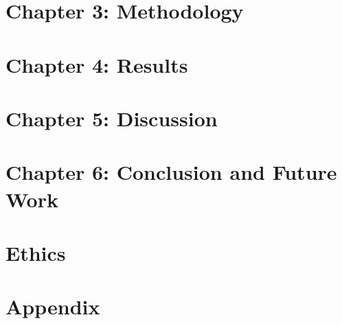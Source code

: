 \documentclass[12pt,oneside,letterpaper,english]{article}
\begin{document}
\section{Chapter 3: Methodology} \label{meth}
 
\newpage

\section{Chapter 4: Results} \label{res}
 
\newpage

\section{Chapter 5: Discussion} \label{dis}
 
\newpage

\section{Chapter 6: Conclusion and Future Work} \label{conc}

\newpage

\section{Ethics} \label{ethics}

\label{EndOfText}
\newpage

\fancyfoot[C]{\thepage}
\printbibliography

 
 \newpage
 \section{Appendix} \label{appen}
 
\end{document}
